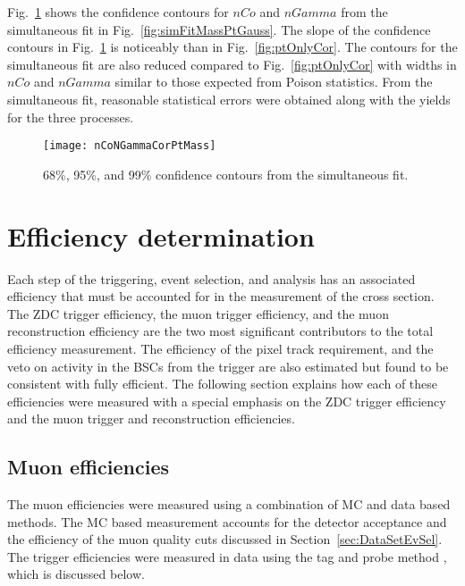     Fig.~\ref{fig:simGaussCor} shows the confidence contours for $nCo$ and 
      $nGamma$ from the simultaneous fit in Fig.~\ref{fig:simFitMassPtGauss}.  
    The slope of the confidence contours in Fig.~\ref{fig:simGaussCor} 
      is noticeably than in Fig.~\ref{fig:ptOnlyCor}.
    The contours for the simultaneous fit are also reduced compared to 
      Fig.~\ref{fig:ptOnlyCor} with widths in $nCo$ and $nGamma$ similar to 
      those expected from Poison statistics. 
    From the simultaneous fit, reasonable statistical errors were obtained 
      along with the yields for the three processes. 

    \begin{figure}[!Hhbt]
      \centering
      \texttt{[image: nCoNGammaCorPtMass]}
      \caption{68\%, 95\%, and 99\% confidence contours from the 
        simultaneous fit. }
      \label{fig:simGaussCor}
    \end{figure}

  \section{\label{sec:effDet} Efficiency determination}
    Each step of the triggering, event selection, and analysis has an associated
      efficiency that must be accounted for in the  measurement of the \JPsi{} 
      cross section.  
    The ZDC trigger efficiency, the muon trigger efficiency, and the muon 
      reconstruction efficiency are the two most significant contributors to 
      the total efficiency measurement. 
    The efficiency of the pixel track requirement, and the veto on activity in 
      the BSCs from the trigger are also estimated but found to be consistent 
      with fully efficient. 
    The following section explains how each of these efficiencies were measured
      with a special emphasis on the ZDC trigger efficiency and the muon 
      trigger and reconstruction efficiencies. 

    \subsection{Muon efficiencies}
      The muon efficiencies were measured using a combination of MC and data 
        based methods.
      The MC based measurement accounts for the detector acceptance and the 
        efficiency of the muon quality cuts discussed in 
        Section~\ref{sec:DataSetEvSel}.
      The trigger efficiencies were measured in data using the tag and probe 
      method \cite{cmsTnP}, which is discussed below. 

